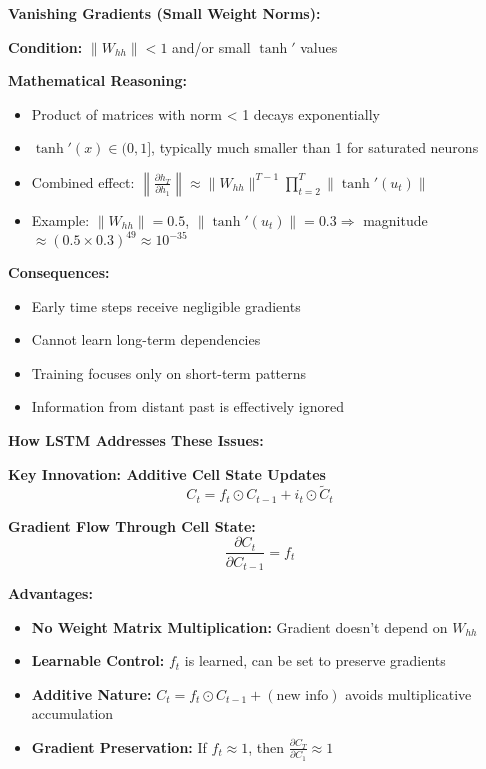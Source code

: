 \documentclass[12pt]{article}
\begin{document}
\begin{enumerate}[(a)]
{    \textbf{Vanishing Gradients (Small Weight Norms):}
    
    \textbf{Condition:} $\|W_{hh}\| < 1$ and/or small $\tanh'$ values
    
    \textbf{Mathematical Reasoning:}
    \begin{itemize}
        \item Product of matrices with norm < 1 decays exponentially
        \item $\tanh'(x) \in (0,1]$, typically much smaller than 1 for saturated neurons
        \item Combined effect: $\left\|\frac{\partial h_T}{\partial h_1}\right\| \approx \|W_{hh}\|^{T-1} \prod_{t=2}^T \|\tanh'(u_t)\|$
        \item Example: $\|W_{hh}\| = 0.5$, $\|\tanh'(u_t)\| = 0.3 \Rightarrow$ magnitude $\approx (0.5 \times 0.3)^{49} \approx 10^{-35}$
    \end{itemize}
    
    \textbf{Consequences:}
    \begin{itemize}
        \item Early time steps receive negligible gradients
        \item Cannot learn long-term dependencies
        \item Training focuses only on short-term patterns
        \item Information from distant past is effectively ignored
    \end{itemize}
    
    \textbf{How LSTM Addresses These Issues:}
    
    \textbf{Key Innovation: Additive Cell State Updates}
    $$C_t = f_t \odot C_{t-1} + i_t \odot \tilde{C}_t$$
    
    \textbf{Gradient Flow Through Cell State:}
    $$\frac{\partial C_t}{\partial C_{t-1}} = f_t$$
    
    \textbf{Advantages:}
    \begin{itemize}
        \item \textbf{No Weight Matrix Multiplication:} Gradient doesn't depend on $W_{hh}$
        \item \textbf{Learnable Control:} $f_t$ is learned, can be set to preserve gradients
        \item \textbf{Additive Nature:} $C_t = f_t \odot C_{t-1} + (\text{new info})$ avoids multiplicative accumulation
        \item \textbf{Gradient Preservation:} If $f_t \approx 1$, then $\frac{\partial C_T}{\partial C_1} \approx 1$
    \end{itemize}
    
}
\end{enumerate}
\end{document}
